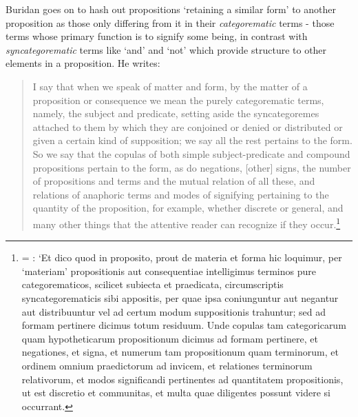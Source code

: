 \documentclass[a4paper, 11pt]{article}
\begin{document}
Buridan goes on to hash out propositions `retaining a similar form' to another proposition as those only differing from it in their \emph{categorematic} terms - those terms whose primary function is to signify some being, in contrast with \emph{syncategorematic} terms like `and' and `not' which provide structure to other elements in a proposition. He writes: 
\begin{quote}
	I say that when we speak of matter and form, by the matter of a proposition or consequence we mean the purely categorematic terms, namely, the subject and predicate, setting aside the syncategoremes attached to them by which they are conjoined or denied or distributed or given a certain kind of supposition; we say all the rest pertains to the form. So we say that the copulas of both simple subject-predicate and compound propositions pertain to the form, as do negations, [other] signs, the number of propositions and terms and the mutual relation of all these, and relations of anaphoric terms and modes of signifying pertaining to the quantity of the proposition, for example, whether discrete or general, and many other things that the attentive reader can recognize if they occur.\footnote{\autocite[74]{Buridan2015} = \autocite[30.7-18]{BuridanTC}: `Et dico quod in proposito, prout de materia et forma hic loquimur, per `materiam' propositionis aut consequentiae intelligimus terminos pure categorematicos, scilicet subiecta et praedicata, circumscriptis syncategorematicis sibi appositis, per quae ipsa coniunguntur aut negantur aut distribuuntur vel ad certum modum suppositionis trahuntur; sed ad formam pertinere dicimus totum residuum. Unde copulas tam categoricarum quam hypotheticarum propositionum dicimus ad formam pertinere, et negationes, et signa, et numerum tam propositionum quam terminorum, et ordinem omnium praedictorum ad invicem, et relationes terminorum relativorum, et modos significandi pertinentes  ad quantitatem propositionis, ut est discretio et communitas, et multa quae diligentes possunt videre si occurrant.}
\end{quote}  
\end{document}
